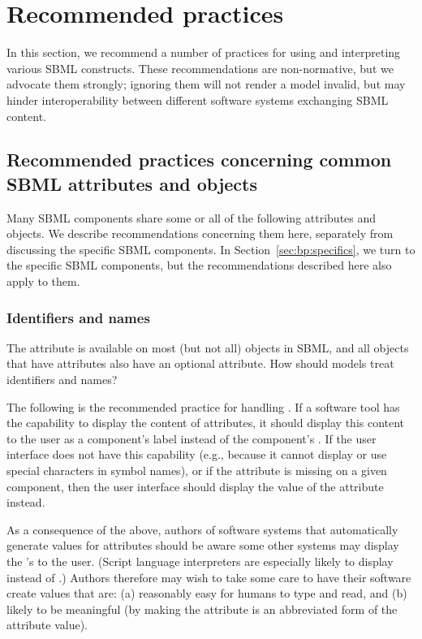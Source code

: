 
\section{Recommended practices}
\label{sec:best-practices}

In this section, we recommend a number of practices for using and
interpreting various SBML constructs.  These recommendations are
non-normative, but we advocate them strongly; ignoring them will
not render a model invalid, but may hinder interoperability
between different software systems exchanging SBML content.


\subsection{Recommended practices concerning common SBML
  attributes and objects}
\label{sec:bp:common}

Many SBML components share some or all of the following attributes
and objects.  We describe recommendations concerning them here,
separately from discussing the specific SBML components.  In
Section~\ref{sec:bp:specifics}, we turn to the specific SBML
components, but the recommendations described here also apply to
them.


\subsubsection{Identifiers and names}
\label{sec:bp:names}

The  attribute is available on most (but not all)
objects in SBML, and all objects that have  attributes
also have an optional  attribute.  How should models
treat identifiers and names?

The following is the recommended practice for handling
.  If a software tool has the capability to
display the content of  attributes, it should
display this content to the user as a component's label instead of
the component's .  If the user interface does not have
this capability (e.g., because it cannot display or use special
characters in symbol names), or if the  attribute is
missing on a given component, then the user interface should
display the value of the  attribute instead.

As a consequence of the above, authors of software systems that
automatically generate values for  attributes should be
aware some other systems may display the 's to the user.
(Script language interpreters are especially likely to display
 instead of .)  Authors therefore may wish
to take some care to have their software create  values
that are: (a) reasonably easy for humans to type and read, and (b)
likely to be meaningful (\eg by making the  attribute is
an abbreviated form of the  attribute value).


